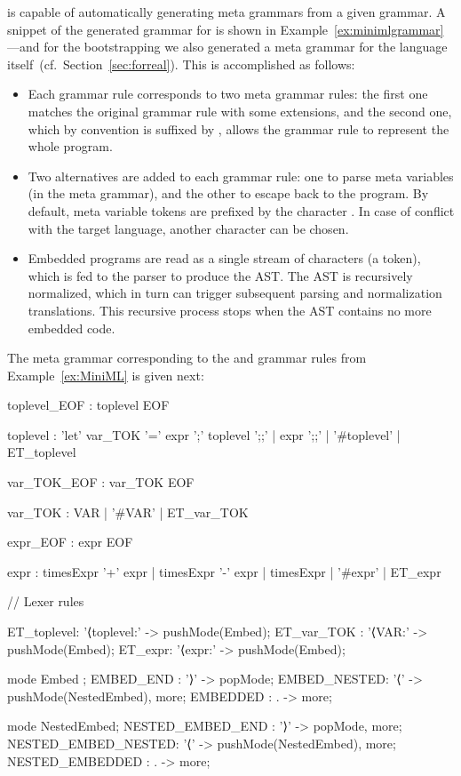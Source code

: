 \Tosca is capable of automatically generating meta grammars from a
given grammar.  A snippet of the generated grammar for \MiniML is
shown in Example~\ref{ex:minimlgrammar}---and for the bootstrapping we
also generated a meta grammar for the \Tosca language
itself~(cf.~Section~\ref{sec:forreal}).  This is accomplished as
follows:
\begin{itemize}
\item Each grammar rule corresponds to two meta grammar rules: the first
  one matches the original grammar rule with some extensions, and the
  second one, which by convention is suffixed by ,
  allows the grammar rule to represent the whole program.
\item Two alternatives are added to each grammar rule: one to parse
  meta variables (in the meta grammar), and the other to escape back to the \Tosca
  program. By default, meta variable tokens are prefixed by the
  character \ToscaIn{#}. In case of conflict with the target 
  language, another character can be chosen.
\item Embedded \Tosca programs are read as a single stream of
  characters (a token), which is fed to the \Tosca parser to
  produce the AST. The AST is recursively normalized, which in turn can
  trigger subsequent parsing and normalization translations. This recursive process
  stops when the AST contains no more embedded code.
\end{itemize}

\begin{example} \label{ex:minimlgrammar}
  The meta grammar corresponding to the  and
   grammar rules from Example~\ref{ex:MiniML}
  is given next:
%
\begin{lstANTLR}
toplevel_EOF : toplevel EOF 

toplevel : 'let' var_TOK  '=' expr ';' toplevel ';;'
         |  expr  ';;'
         |  '#toplevel' 
         | ET_toplevel
             
var_TOK_EOF : var_TOK EOF

var_TOK : VAR  | '#VAR' 
         | ET_var_TOK

expr_EOF :  expr EOF  

expr : timesExpr '+' expr  
      | timesExpr '-' expr
      | timesExpr 
      | '#expr' 
      | ET_expr  

// Lexer rules

ET_toplevel: '⟨toplevel:' -> pushMode(Embed);
ET_var_TOK : '⟨VAR:' -> pushMode(Embed); 
ET_expr: '⟨expr:' -> pushMode(Embed); 

mode Embed ;    
EMBED_END   : '⟩' -> popMode;
EMBED_NESTED: '⟨' -> pushMode(NestedEmbed), more; 
EMBEDDED    : . -> more;  

mode NestedEmbed;  
NESTED_EMBED_END   : '⟩' -> popMode, more;  
NESTED_EMBED_NESTED: '⟨' -> pushMode(NestedEmbed), more;
NESTED_EMBEDDED    : . -> more; 
\end{lstANTLR}	
\end{example}

